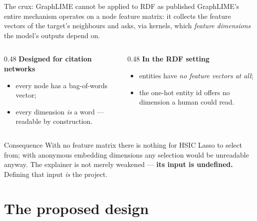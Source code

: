 \documentclass[10pt,aspectratio=169]{beamer}
\begin{document}
\begin{frame}{The crux: GraphLIME cannot be applied to RDF as published}
  GraphLIME's entire mechanism operates on a node \alert{feature matrix}: it
  collects the feature vectors of the target's neighbours and asks, via
  kernels, which \emph{feature dimensions} the model's outputs depend on.

  \vfill
  \begin{columns}[T,onlytextwidth]
    \begin{column}{0.48\textwidth}
      \textbf{Designed for citation networks}
      \begin{itemize}
        \item every node has a bag-of-words vector;
        \item every dimension \emph{is} a word --- readable by construction.
      \end{itemize}
    \end{column}
    \begin{column}{0.48\textwidth}
      \textbf{In the RDF setting}
      \begin{itemize}
        \item entities have \emph{no feature vectors at all};
        \item the one-hot entity id offers no dimension a human could read.
      \end{itemize}
    \end{column}
  \end{columns}

  \vfill
  \begin{alertblock}{Consequence}
    With no feature matrix there is nothing for HSIC Lasso to select from;
    with anonymous embedding dimensions any selection would be unreadable
    anyway. The explainer is not merely weakened --- \textbf{its input is
    undefined.} Defining that input \emph{is} the project.
  \end{alertblock}
\end{frame}

\section{The proposed design}
\end{document}
